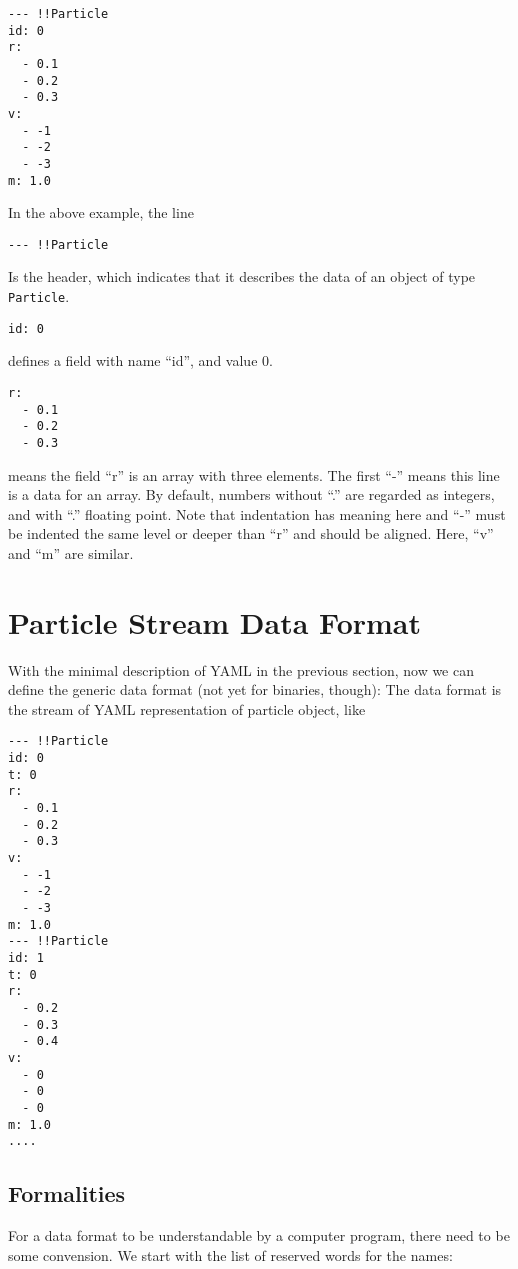 \documentclass[5p,authoryear]{elsarticle}
\begin{document}
\begin{verbatim}
--- !!Particle
id: 0
r:
  - 0.1
  - 0.2
  - 0.3
v:
  - -1
  - -2
  - -3
m: 1.0
\end{verbatim}

In the above example, the line

\begin{verbatim}
--- !!Particle
\end{verbatim}
Is the header, which indicates that it describes the data of an object
of type {\tt Particle}.


\begin{verbatim}
id: 0
\end{verbatim}
defines a field with name ``id'', and value 0.
\begin{verbatim}
r:
  - 0.1
  - 0.2
  - 0.3
\end{verbatim}
means the field ``r'' is an array with three elements. The
first ``-'' means this line is a data for an array.
By default, numbers without ``.'' are regarded as integers, and with
``.'' floating point. Note that indentation has meaning here and ``-''
must be indented the same level or deeper than ``r'' and should be aligned.
Here,  ``v'' and ``m'' are similar.


\section{Particle Stream Data Format}


With the  minimal description of YAML in the previous section, now
we can define the generic data format (not yet for binaries, though):
The data format is the stream of YAML representation of particle
object, like

\begin{verbatim}
--- !!Particle
id: 0
t: 0
r:
  - 0.1
  - 0.2
  - 0.3
v:
  - -1
  - -2
  - -3
m: 1.0
--- !!Particle
id: 1
t: 0
r:
  - 0.2
  - 0.3
  - 0.4
v:
  - 0
  - 0
  - 0
m: 1.0
....
\end{verbatim}

\subsection{Formalities}

For a data format to be understandable by a computer program, there
need to be some convension. We start with the list of reserved words
for the names:
\end{document}
